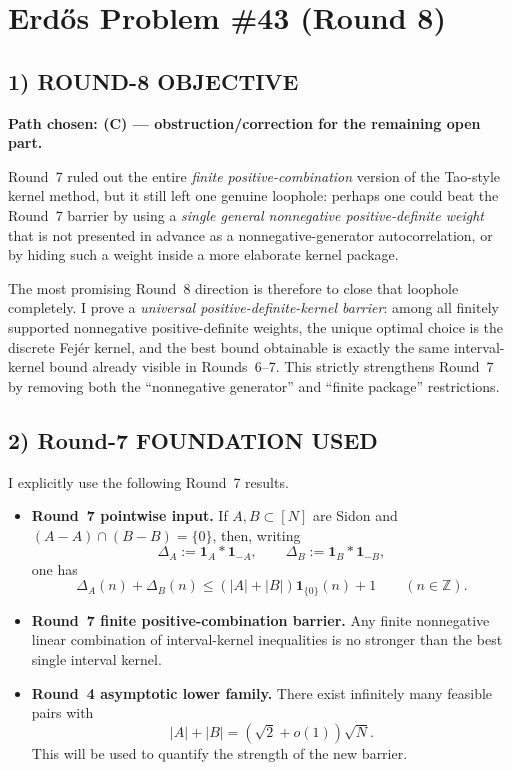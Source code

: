 \section{Erd\H{o}s Problem \#43 (Round 8)}

\subsection{1) ROUND-8 OBJECTIVE}

\textbf{Path chosen: (C) --- obstruction/correction for the remaining open part.}

Round~7 ruled out the entire \emph{finite positive-combination} version of the Tao-style kernel method, but it still left one genuine loophole: perhaps one could beat the Round~7 barrier by using a \emph{single general nonnegative positive-definite weight} that is not presented in advance as a nonnegative-generator autocorrelation, or by hiding such a weight inside a more elaborate kernel package.

The most promising Round~8 direction is therefore to close that loophole completely.  I prove a \emph{universal positive-definite-kernel barrier}: among all finitely supported nonnegative positive-definite weights, the unique optimal choice is the discrete Fej\'er kernel, and the best bound obtainable is exactly the same interval-kernel bound already visible in Rounds~6--7.  This strictly strengthens Round~7 by removing both the ``nonnegative generator'' and ``finite package'' restrictions.

\subsection{2) Round-7 FOUNDATION USED}

I explicitly use the following Round~7 results.
\begin{itemize}
\item \textbf{Round~7 pointwise input.} If $A,B\subset[N]$ are Sidon and $(A-A)\cap(B-B)=\{0\}$, then, writing
\[
\Delta_A:=\mathbf 1_A*\mathbf 1_{-A},\qquad \Delta_B:=\mathbf 1_B*\mathbf 1_{-B},
\]
one has
\[
\Delta_A(n)+\Delta_B(n)\le (|A|+|B|)\mathbf 1_{\{0\}}(n)+1
\qquad (n\in\mathbb Z).
\]
\item \textbf{Round~7 finite positive-combination barrier.} Any finite nonnegative linear combination of interval-kernel inequalities is no stronger than the best single interval kernel.
\item \textbf{Round~4 asymptotic lower family.} There exist infinitely many feasible pairs with
\[
|A|+|B|=(\sqrt 2+o(1))\sqrt N.
\]
This will be used to quantify the strength of the new barrier.
\end{itemize}

